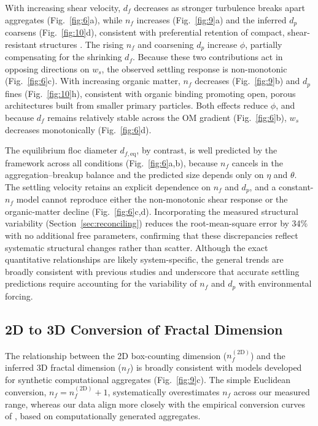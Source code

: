 \documentclass{agujournal2019}
\begin{document}
With increasing shear velocity, $d_f$ decreases as stronger turbulence breaks apart aggregates (Fig.~\ref{fig:6}a), while $n_f$ increases (Fig.~\ref{fig:9}a) and the inferred $d_p$ coarsens (Fig.~\ref{fig:10}d), consistent with preferential retention of compact, shear-resistant structures \cite{winterwerp1998simple}. The rising $n_f$ and coarsening $d_p$ increase $\phi$, partially compensating for the shrinking $d_f$. Because these two contributions act in opposing directions on $w_s$, the observed settling response is non-monotonic (Fig.~\ref{fig:6}c). With increasing organic matter, $n_f$ decreases (Fig.~\ref{fig:9}b) and $d_p$ fines (Fig.~\ref{fig:10}h), consistent with organic binding promoting open, porous architectures built from smaller primary particles. Both effects reduce $\phi$, and because $d_f$ remains relatively stable across the OM gradient (Fig.~\ref{fig:6}b), $w_s$ decreases monotonically (Fig.~\ref{fig:6}d).

The equilibrium floc diameter $d_{f,\text{eq}}$, by contrast, is well predicted by the  framework across all conditions (Fig.~\ref{fig:6}a,b), because $n_f$ cancels in the aggregation--breakup balance and the predicted size depends only on $\eta$ and $\theta$. The settling velocity retains an explicit dependence on $n_f$ and $d_p$, and a constant-$n_f$ model cannot reproduce either the non-monotonic shear response or the organic-matter decline (Fig.~\ref{fig:6}c,d). Incorporating the measured structural variability (Section~\ref{sec:reconciling}) reduces the root-mean-square error by 34\% with no additional free parameters, confirming that these discrepancies reflect systematic structural changes rather than scatter. Although the exact quantitative relationships are likely system-specific, the general trends are broadly consistent with previous studies and underscore that accurate settling predictions require accounting for the variability of $n_f$ and $d_p$ with environmental forcing.

\subsection{2D to 3D Conversion of Fractal Dimension}
The relationship between the 2D box-counting dimension ($n_f^{(\mathrm{2D})}$) and the inferred 3D fractal dimension ($n_f$) is broadly consistent with models developed for synthetic computational aggregates (Fig.~\ref{fig:9}c). The simple Euclidean conversion, $n_f = n_f^{(\mathrm{2D})} + 1$, systematically overestimates $n_f$ across our measured range, whereas our data align more closely with the empirical conversion curves of , based on computationally generated aggregates. 
\end{document}
